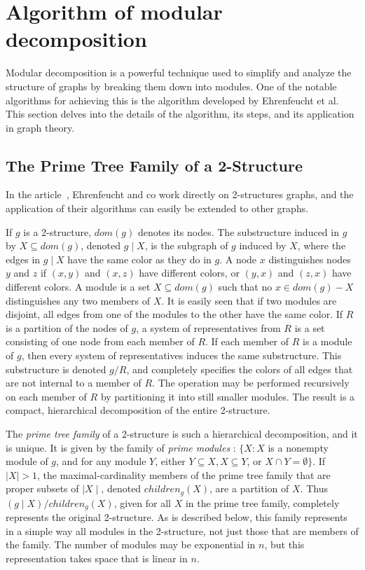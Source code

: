 
\chapter{Algorithm of modular decomposition}\label{ch:algorithm-of-modular-decomposition}

Modular decomposition is a powerful technique used to simplify and analyze the structure of graphs by breaking them down into modules.
One of the notable algorithms for achieving this is the algorithm developed by Ehrenfeucht et al.
This section delves into the details of the algorithm, its steps, and its application in graph theory.

\section{The Prime Tree Family of a 2-Structure}\label{sec:the-prime-tree-family-of-a-2-structure}

In the article~\cite{PTDMD}, Ehrenfeucht and co work directly on 2-structures graphs, and the application of their algorithms can easily be extended to other graphs.


If $g$ is a 2-structure, $dom(g)$ denotes its nodes.
The substructure induced in $g$ by $X \subseteq dom(g)$, denoted $g \mid X$, is the subgraph of $g$ induced by $X$, where the edges in $g \mid X$ have the same color as they do in $g$.
A node $x$ distinguishes nodes $y$ and $z$ if $(x, y)$ and $(x, z)$ have different colors, or $(y, x)$ and $(z, x)$ have different colors.
A module is a set $X \subseteq dom(g)$ such that no $x \in dom(g) - X$ distinguishes any two members of $X$.
It is easily seen that if two modules are disjoint, all edges from one of the modules to the other have the same color.
If $R$ is a partition of the nodes of $g$, a system of representatives from $R$ is a set consisting of one node from each member of $R$.
If each member of $R$ is a module of $g$, then every system of representatives induces the same substructure.
This substructure is denoted $g / R$, and completely specifies the colors of all edges that are not internal to a member of $R$.
The operation may be performed recursively on each member of $R$ by partitioning it into still smaller modules.
The result is a compact, hierarchical decomposition of the entire 2-structure.

The \textit{prime tree family} of a 2-structure is such a hierarchical decomposition, and it is unique.
It is given by the family of \textit{prime modules} : $\{X : X$ is a nonempty module of $g$, and for any module $Y$, either $Y \subseteq X, X \subseteq Y$, or $X \cap Y = \emptyset\}$.
If $\mid X \mid > 1$, the maximal-cardinality members of the prime tree family that are proper subsets of $\mid X \mid$, denoted $children_g(X)$, are a partition of $X$.
Thus $(g \mid X) / children_g(X)$, given for all $X$ in the prime tree family, completely represents the original 2-structure.
As is described below, this family represents in a simple way all modules in the 2-structure, not just those that are members of the family.
The number of modules may be exponential in $n$, but this representation takes space that is linear in $n$.

